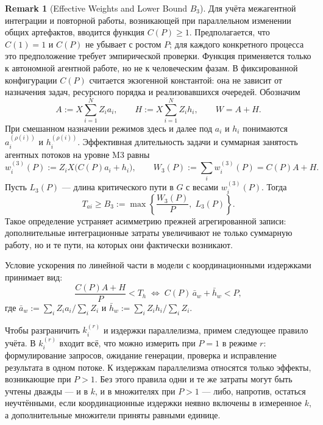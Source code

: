 \documentclass[12pt,a4paper]{article}
\theoremstyle{definition}
\newtheorem{remark}{Remark}
\begin{document}
\begin{remark}[Effective Weights and Lower Bound $B_3$]\label{rem:coordination}
Для учёта межагентной интеграции и повторной работы, возникающей при параллельном изменении общих артефактов, вводится функция $C(P) \ge 1$. Предполагается, что $C(1)=1$ и $C(P)$ не убывает с ростом $P$; для каждого конкретного процесса это предположение требует эмпирической проверки. Функция применяется только к автономной агентной работе, но не к человеческим фазам. В фиксированной конфигурации $C(P)$ считается экзогенной константой: она не зависит от назначения задач, ресурсного порядка и реализовавшихся очередей. Обозначим
\[
  A := X\sum_{i=1}^{N}Z_i a_i, \qquad
  H := X\sum_{i=1}^{N}Z_i h_i, \qquad W=A+H.
\]
При смешанном назначении режимов здесь и далее под $a_i$ и $h_i$ понимаются
$a_i^{(\rho(i))}$ и $h_i^{(\rho(i))}$.
Эффективная длительность задачи и суммарная занятость агентных потоков на уровне M3 равны
\[
  w_i^{(3)}(P):=Z_iX\bigl(C(P)a_i+h_i\bigr), \qquad
  W_3(P):=\sum_i w_i^{(3)}(P)=C(P)A+H.
\]
Пусть $L_3(P)$ --- длина критического пути в $G$ с весами $w_i^{(3)}(P)$. Тогда
\[
  T_{ai} \ge B_3 := \max\left\{ \frac{W_3(P)}{P},\; L_3(P) \right\}.
\]
Такое определение устраняет асимметрию прежней агрегированной записи: дополнительные интеграционные затраты увеличивают не только суммарную работу, но и те пути, на которых они фактически возникают.

Условие ускорения по линейной части в модели с координационными издержками принимает вид:
\[
  \frac{C(P)A+H}{P} < T_h
  \;\iff\;
  C(P)\,\bar a_w+\bar h_w<P,
\]
где $\bar a_w:=\sum_iZ_i a_i/\sum_iZ_i$ и $\bar h_w:=\sum_iZ_i h_i/\sum_iZ_i$.

Чтобы разграничить $k_i^{(r)}$ и издержки параллелизма, примем следующее правило учёта. В $k_i^{(r)}$ входит всё, что можно измерить при $P = 1$ в режиме $r$: формулирование запросов, ожидание генерации, проверка и исправление результата в одном потоке. К издержкам параллелизма относятся только эффекты, возникающие при $P > 1$. Без этого правила одни и те же затраты могут быть учтены дважды --- и в $k$, и в множителях при $P > 1$ --- либо, напротив, остаться неучтёнными, если координационные издержки неявно включены в измеренное $k$, а дополнительные множители приняты равными единице.


\end{remark}
\end{document}
